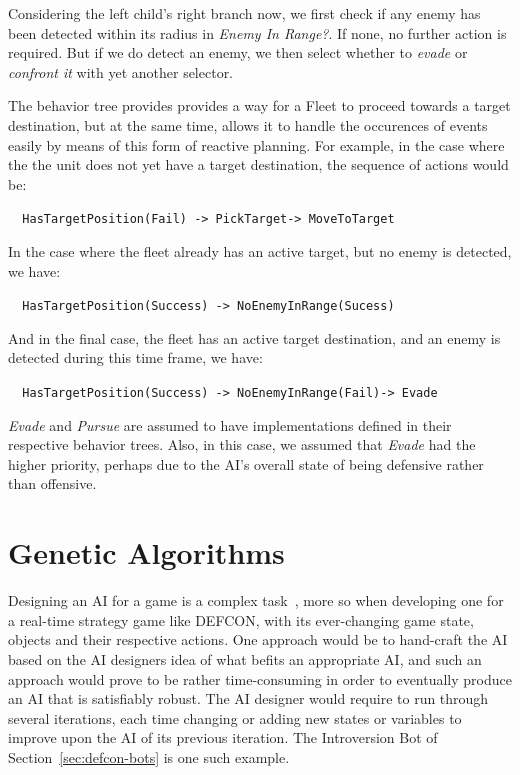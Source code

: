        Considering the left child's right branch now, we first check if any enemy has been detected within its radius in \emph{Enemy In Range?}. If none, no further action is required. But if we do detect an enemy, we then select whether to \emph{evade} or \emph{confront it} with yet another selector. 
       
       The behavior tree provides provides a way for a Fleet to proceed towards a target destination, but at the same time, allows it to handle the occurences of events easily by means of this form of reactive planning. For example, in the case where the the unit does not yet have a target destination, the sequence of actions would be:
       
       \begin{center}
       \texttt{ \scriptsize{ HasTargetPosition(Fail) -> PickTarget-> MoveToTarget} }
       \end{center}
       
       In the case where the fleet already has an active target, but no enemy is detected, we have:
       
       \begin{center}
       \texttt{ \scriptsize{ HasTargetPosition(Success) -> NoEnemyInRange(Sucess) } }
       \end{center}
       
       And in the final case, the fleet has an active target destination, and an enemy is detected during this time frame, we have:
       
       \begin{center}
       \texttt{ \scriptsize{ HasTargetPosition(Success) -> NoEnemyInRange(Fail)-> Evade} }
       \end{center}
       
       \emph{Evade} and \emph{Pursue} are assumed to have implementations defined in their respective behavior trees. Also, in this case, we assumed that \emph{Evade} had the higher priority, perhaps due to the AI's overall state of being defensive rather than offensive.
 
    \newpage
    
    \section{Genetic Algorithms} 
    \label{sec:ga}
        Designing an AI for a game is a complex task~\cite{actionprioritisation}, more so when developing one for a real-time strategy game like DEFCON, with its ever-changing game state, objects and their respective actions. One approach would be to hand-craft the AI based on the AI designers idea of what befits an appropriate AI, and such an approach would prove to be rather time-consuming in order to eventually produce an AI that is satisfiably robust. The AI designer would require to run through several iterations, each time changing or adding new states or variables to improve upon the AI of its previous iteration. The Introversion Bot of Section~\ref{sec:defcon-bots} is one such example.
        
